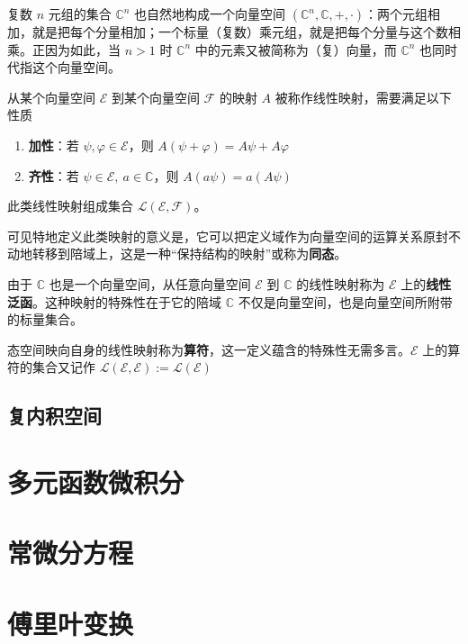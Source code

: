 \documentclass[cn,10pt,math=newtx,citestyle=gb7714-2015,bibstyle=gb7714-2015]{elegantbook}
\def\ms{\mathscr}
\def\mc{\mathcal}
\def\C{\mathbb C}
\def\vphi{\varphi}
\begin{document}
\begin{instance}
复数 $n$ 元组的集合 $\C^n$ 也自然地构成一个向量空间 $(\C^n,\C,+,\cdot)$：两个元组相加，就是把每个分量相加；一个标量（复数）乘元组，就是把每个分量与这个数相乘。正因为如此，当 $n>1$ 时 $\C^n$ 中的元素又被简称为（复）向量，而 $\C^n$ 也同时代指这个向量空间。
\end{instance}

\begin{definition}[线性映射]\label{def:linearmap}
从某个向量空间 $\ms E$ 到某个向量空间 $\ms F$ 的映射 $A$ 被称作线性映射，需要满足以下性质

    \begin{enumerate}
        \item \textbf{加性}：若 $\psi,\vphi\in\ms E$，则 $A(\psi+\vphi)=A\psi+A\vphi$
        \item \textbf{齐性}：若 $\psi\in\ms E,\ a\in\C$，则 $A(a\psi)=a(A\psi)$
    \end{enumerate}
    
此类线性映射组成集合 $\mc L(\ms E,\ms F)$。
\end{definition}

可见特地定义此类映射的意义是，它可以把定义域作为向量空间的运算关系原封不动地转移到陪域上，这是一种“保持结构的映射”或称为\textbf{同态}。

\begin{instance}
由于 $\C$ 也是一个向量空间，从任意向量空间 $\ms E$ 到 $\C$ 的线性映射称为 $\ms E$ 上的\textbf{线性泛函}。这种映射的特殊性在于它的陪域 $\C$ 不仅是向量空间，也是向量空间所附带的标量集合。
\end{instance}

\begin{instance}
态空间映向自身的线性映射称为\textbf{算符}，这一定义蕴含的特殊性无需多言。$\ms E$ 上的算符的集合又记作 $\mc L(\ms E,\ms E):=\mc L(\ms E)$
\end{instance}

\section{复内积空间}

\chapter{多元函数微积分}

\chapter{常微分方程}

\chapter{傅里叶变换}
\fi
\end{document}
